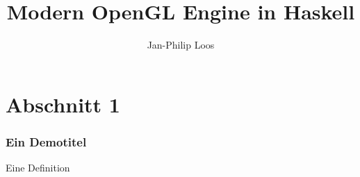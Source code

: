 

\title{Modern OpenGL Engine in Haskell}
\author{Jan-Philip Loos}
\date{\protect{}}


\maketitle
\frame{\tableofcontents[currentsection]}

\section{Abschnitt 1}
\begin{frame} %
  \frametitle{Ein Demotitel} %
  \begin{Definition} %
    Eine Definition
  \end{Definition}
\end{frame}

